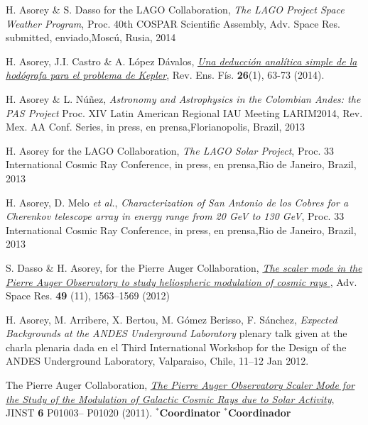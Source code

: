 \begin{etaremune}
\item {}H. Asorey \& S. Dasso for the LAGO Collaboration, {\emph{The LAGO Project Space Weather Program}}, \en Proc. 40th COSPAR Scientific Assembly, Adv. Space Res. \ifeng submitted, \else enviado,\fi  Moscú, Rusia, 2014

\item {}H. Asorey, J.I. Castro \& A. López Dávalos, \href{http://www.revistas.unc.edu.ar/index.php/revistaEF/article/view/9512}{\emph{Una deducción analítica simple de la hodógrafa para el problema de Kepler}}, Rev. Ens. Fís. {\bf{26}}(1), 63-73 (2014).

\item {}H. Asorey \& L. Núñez, {\emph{Astronomy and Astrophysics in the Colombian Andes: the PAS Project}} \en Proc. XIV Latin American Regional IAU Meeting LARIM2014, Rev. Mex. AA Conf. Series, \ifeng in press, \else en prensa,\fi  Florianopolis, Brazil, 2013

\item {}H. Asorey for the LAGO Collaboration, {\emph{The LAGO Solar Project}}, \en Proc. 33 International Cosmic Ray Conference, \ifeng in press, \else en prensa,\fi  Rio de Janeiro, Brazil, 2013

\item {}H. Asorey, D. Melo {\emph{et al.}}, {\emph{Characterization of San Antonio de los Cobres for a Cherenkov telescope array in energy range from 20 GeV to 130 GeV}}, \en Proc. 33 International Cosmic Ray Conference, \ifeng in press, \else en prensa,\fi  Rio de Janeiro, Brazil, 2013

\item {}S. Dasso \& H. Asorey, for the Pierre Auger Collaboration,
\href{http://dx.doi.org/10.1016/j.asr.2011.12.028}{\emph{ The scaler mode in
the Pierre Auger Observatory to study heliospheric modulation of cosmic rays
}}, Adv. Space Res. {\bf{49}} (11), 1563--1569 (2012)

\item {} H. Asorey, M. Arribere, X. Bertou, M. Gómez Berisso, F. Sánchez,
{\emph{Expected Backgrounds at the ANDES Underground Laboratory}}
\ifeng
plenary talk given at the
\else 
charla plenaria dada en el
\fi
Third International Workshop for the Design of the ANDES Underground Laboratory, Valparaiso, Chile, 11--12 Jan 2012.

\item {}The Pierre Auger Collaboration,
\href{http://dx.doi.org/10.1088/1748-0221/6/01/P01003}{\emph{The Pierre Auger
Observatory Scaler Mode for the Study of the Modulation of Galactic Cosmic Rays
due to Solar Activity}}, JINST {\bf 6} P01003--
P01020 (2011).
\ifeng $^*${\bf{Coordinator}} \else $^*${\bf{Coordinador}} \fi


\end{etaremune}
